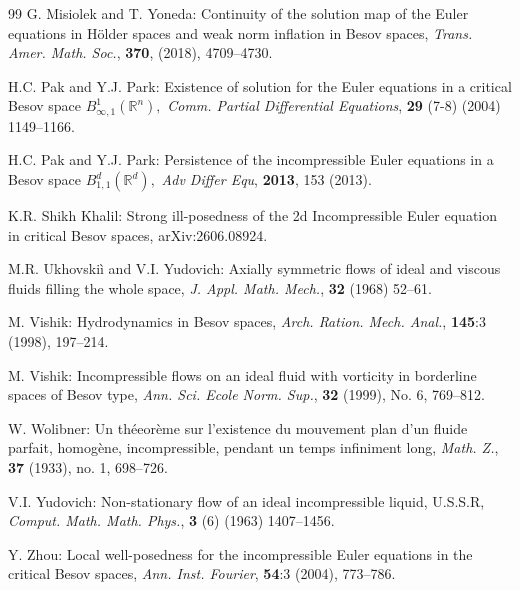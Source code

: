\documentclass[11pt]{amsart}
\newcommand{\R}{{\mathbb R}}
\numberwithin{equation}{section}
\begin{document}
\begin{thebibliography}{99}
    G. Misiolek and T. Yoneda:  {Continuity of the solution map of the Euler equations in H\"older spaces and weak norm inflation in Besov spaces}, \emph{Trans. Amer. Math. Soc.},  {\bf 370}, (2018), 4709--4730.
  
    H.C. Pak and Y.J. Park: Existence of solution for the Euler equations in a critical Besov space $B^1_{\infty,1}(\R^n),$ 
 \emph{Comm. Partial Differential Equations}, {\bf 29} (7-8) (2004) 1149–1166. 
 
   H.C. Pak and Y.J. Park: Persistence of the incompressible Euler equations in a Besov space  $B^{d}_{1,1}(\R^{d}),$ 
 \emph{Adv Differ Equ}, {\bf 2013}, 153 (2013).
 
 
  K.R. Shikh Khalil:  Strong ill-posedness of the 2d Incompressible Euler equation in critical Besov spaces, 
 arXiv:2606.08924.
 
  M.R. Ukhovskiì and V.I. Yudovich:
 Axially symmetric flows of ideal and viscous fluids filling the whole space, \emph{J. Appl. Math. Mech.}, {\bf 32} (1968) 52–61. 
 
  M. Vishik: Hydrodynamics in Besov spaces, \emph{Arch. Ration. Mech. Anal.}, {\bf 145}:3 (1998), 197–214.
 
  M. Vishik: {Incompressible flows on an ideal fluid with vorticity in borderline spaces of Besov type}, 
 \emph{Ann. Sci. Ecole Norm. Sup.}, {\bf 32} (1999), No. 6, 769--812. 
 
  W. Wolibner:  Un th\'eeor\`eme sur  l'existence du mouvement plan d'un fluide parfait, homog\`ene, incompressible, pendant un temps infiniment long, \emph{Math. Z.}, {\bf 37} (1933), no. 1, 698--726. 
 
  V.I. Yudovich:  Non-stationary flow of an ideal incompressible liquid, U.S.S.R, 
 \emph{Comput. Math. Math. Phys.}, {\bf 3} (6) (1963) 1407–1456. 
 
  Y. Zhou:  Local well-posedness for the incompressible Euler equations in the critical Besov spaces, \emph{Ann. Inst. Fourier},  {\bf 54}:3 (2004), 773–786.
    
\end{thebibliography}    
    

 
 
 
  
\end{document}
